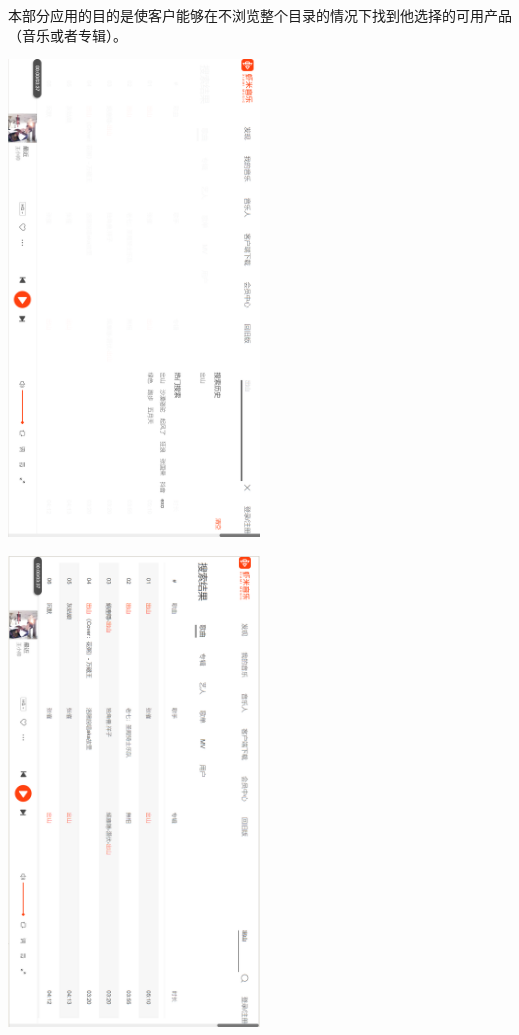 本部分应用的目的是使客户能够在不浏览整个目录的情况下找到他选择的可用产品（音乐或者专辑）。
\begin{center} 
	\begin{sideways}
	\includegraphics[width=0.5\textwidth]{./figures/capture2.png} 
	\end{sideways}
	\end{center}
	\begin{center} 
		\begin{sideways}
		\includegraphics[width=0.5\textwidth]{./figures/capture3.png} 
		\end{sideways}
		\end{center}
